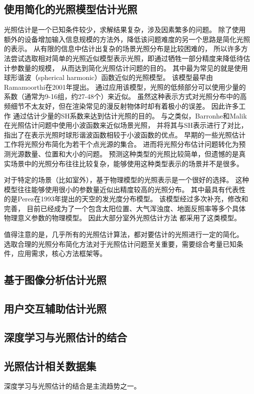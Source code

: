 \subsection{使用简化的光照模型估计光照}
光照估计是一个已知条件较少，求解结果复杂，涉及因素繁多的问题。
除了使用额外的设备增加输入信息规模的方法外，降低该问题难度的另一个思路是简化光照的表示。
从有限的信息中估计出复杂的场景光照分布是比较困难的，
所以许多方法尝试选取相对简单的光照近似模型表示光照，即通过牺牲一部分精度来降低待估计参数量的规模，
从而达到简化光照估计问题的目的。
其中最为常见的就是使用球形谐波（spherical harmonic）函数近似的光照模型。
该模型最早由Ramamoorthi\cite{ramamoorthi2001efficient}在2001年提出。
通过应用该模型，光照的低频部分可以使用少量的系数（通常为9-16组，约27-48个）来近似。
虽然这种表示方式对光照分布中的高频细节不太友好，但在渲染常见的漫反射物体时却有着极小的误差。
因此许多工作\cite{ramamoorthi2001signal,kemelmacher20113d,garrido2013reconstructing,
knorr2014real,li2014intrinsic,barron2015shape, rematas2016deep}
通过估计少量的SH系数来达到估计光照的目的。
与之类似，Barronhe和Malik\cite{okabe2004spherical}在光照估计问题中使用小波函数来近似场景光照，
并将其与SH表示进行了对比，指出了在表示光照时球形谐波函数相较于小波函数的优点。
早期的一些光照估计工作\cite{sato1999acquiring,  panagopoulos2011illumination, 
wang2002estimation, li2003multiple, sato2003illumination}将光照分布简化为若干个点光源的集合。
进而将光照分布估计问题转化为预测光源数量、位置和大小的问题。
预测这种类型的光照比较简单，但遗憾的是真实场景中的光照分布往往比较复杂，能够使用这种类型表示的场景并不是很多。

对于特定的场景（比如室外），基于物理模型的光照表示是一个很好的选择。
这种模型往往能够使用很小的参数量近似出精度较高的光照分布。
其中最具有代表性的是Perez\cite{perez1993all}在1993年提出的天空的发光度分布模型。
该模型经过多次补充，修改和完善\cite{nishita1996display, sirai1993display,
preetham1999practical,raab2008unbiased,hosek2012analytic, hovsekhovsek2013adding}，
目前已经成为了一个包含太阳位置、大气浑浊度、地面反照率等多个具体物理意义参数的物理模型。
因此大部分室外光照估计方法\cite{lalonde2008does, lalonde2010sun, lalonde2012estimating, sunkavalli2008color}
都采用了这类模型。

值得注意的是，几乎所有的光照估计算法，都对要估计的光照进行一定的简化。
选取合理的光照分布简化方法对于光照估计问题至关重要，需要综合考量已知条件，应用需求，核心方法框架等。

\subsection{基于图像分析估计光照}
\cite{lombardi2016reflectance}
\cite{karsch2014automatic}
\subsection{用户交互辅助估计光照}

\subsection{深度学习与光照估计的结合}

\subsection{光照估计相关数据集}

深度学习与光照估计的结合是主流趋势之一。